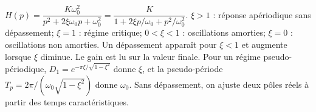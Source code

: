 \begin{corrigebox}
$H(p)=\dfrac{K\omega_0^2}{p^2+2\xi\omega_0p+\omega_0^2}
            =\dfrac{K}{1+2\xi p/\omega_0+p^2/\omega_0^2}$.
$\xi>1$ : réponse apériodique sans dépassement; $\xi=1$ : régime critique;
            $0<\xi<1$ : oscillations amorties; $\xi=0$ : oscillations non amorties.
            Un dépassement apparaît pour $\xi<1$ et augmente lorsque $\xi$ diminue.
Le gain est lu sur la valeur finale. Pour un régime pseudo-périodique,
            $D_1=e^{-\pi\xi/\sqrt{1-\xi^2}}$ donne $\xi$, et la pseudo-période
            $T_p=2\pi/(\omega_0\sqrt{1-\xi^2})$ donne $\omega_0$.
            Sans dépassement, on ajuste deux pôles réels à partir des temps caractéristiques.
\end{corrigebox}
